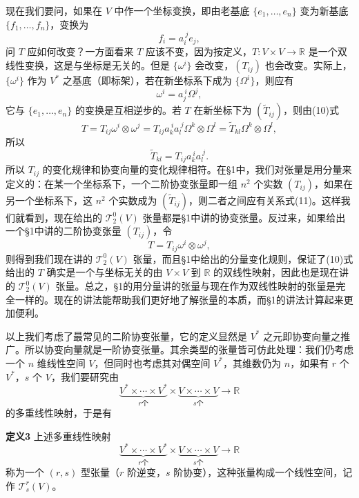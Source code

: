 现在我们要问，如果在 $V$ 中作一个坐标变换，即由老基底 $\{e_1,\ldots,e_n\}$ 变为新基底 $\{f_1,\ldots,f_n\}$，变换为
\[
 f_i=a_i^{\ j}e_j,
\]
问 $T$ 应如何改变？一方面看来 $T$ 应该不变，因为按定义，$T:V\times V\to\mathbb R$ 是一个双线性变换，这是与坐标是无关的。但是 $\{\omega^i\}$ 会改变，$(T_{ij})$ 也会改变。实际上，$\{\omega^i\}$ 作为 $V^*$ 之基底（即标架），若在新坐标系下成为 $\{\Omega^i\}$，则应有
\[
 \omega^i=a_j^{\ i}\Omega^j,
\]
它与 $\{e_1,\ldots,e_n\}$ 的变换是互相逆步的。若 $T$ 在新坐标下为 $(\widetilde T_{ij})$，则由(10)式
\[
 T=T_{ij}\omega^i\otimes\omega^j
 =T_{ij}a_k^{\ i}a_l^{\ j}\Omega^k\otimes\Omega^l
 =\widetilde T_{kl}\Omega^k\otimes\Omega^l,
\]
所以
\begin{equation}
 \widetilde T_{kl}=T_{ij}a_k^{\ i}a_l^{\ j}.
 \tag{11}
\end{equation}
所以 $T_{ij}$ 的变化规律和协变向量的变化规律相符。在§1中，我们对张量是用分量来定义的：在某一个坐标系下，一个二阶协变张量即一组 $n^2$ 个实数 $(T_{ij})$，如果在另一个坐标系下，这 $n^2$ 个实数成为 $(\widetilde T_{ij})$，则二者之间应有关系式(11)。这样我们就看到，现在给出的 $\mathcal T^0_2(V)$ 张量都是§1中讲的协变张量。反过来，如果给出一个§1中讲的二阶协变张量 $(T_{ij})$，令
\[
 T=T_{ij}\omega^i\otimes\omega^j,
\]
则得到我们现在讲的 $\mathcal T^0_2(V)$ 张量，而且§1中给出的分量变化规则，保证了(10)式给出的 $T$ 确实是一个与坐标无关的由 $V\times V$ 到 $\mathbb R$ 的双线性映射，因此也是现在讲的 $\mathcal T^0_2(V)$ 张量。总之，§1的用分量讲的张量与现在作为双线性映射的张量是完全一样的。现在的讲法能帮助我们更好地了解张量的本质，而§1的讲法计算起来更加便利。

以上我们考虑了最常见的二阶协变张量，它的定义显然是 $V^*$ 之元即协变向量之推广。所以协变向量就是一阶协变张量。其余类型的张量皆可仿此处理：我们仍考虑一个 $n$ 维线性空间 $V$，但同时也考虑其对偶空间 $V^*$，其维数仍为 $n$，如果有 $r$ 个 $V^*$，$s$ 个 $V$，我们要研究由
\[
 \underbrace{V^*\times\cdots\times V^*}_{r\text{个}}
 \times
 \underbrace{V\times\cdots\times V}_{s\text{个}}
 \longrightarrow\mathbb R
\]
的多重线性映射，于是有

\noindent\textbf{定义3}
上述多重线性映射
\begin{equation}
 \underbrace{V^*\times\cdots\times V^*}_{r\text{个}}
 \times
 \underbrace{V\times\cdots\times V}_{s\text{个}}
 \longrightarrow\mathbb R
 \tag{12}
\end{equation}
称为一个 $(r,s)$ 型张量（$r$ 阶逆变，$s$ 阶协变），这种张量构成一个线性空间，记作 $\mathcal T^r_s(V)$。

